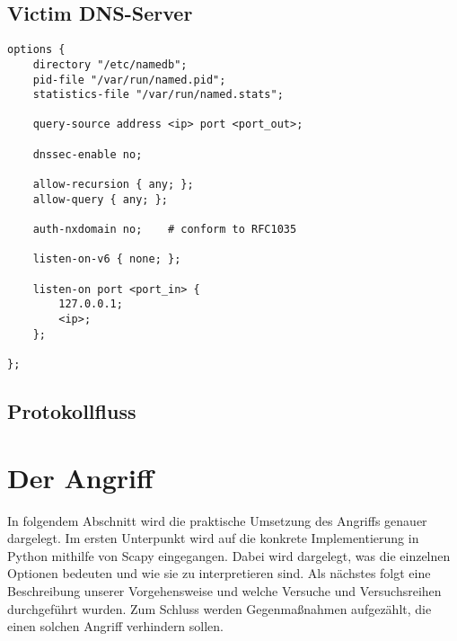\documentclass[10pt,a4paper]{article}
\begin{document}
\subsection{Victim DNS-Server}
\begin{center}
\begin{lstlisting}
options {
    directory "/etc/namedb";
    pid-file "/var/run/named.pid";
    statistics-file "/var/run/named.stats";

    query-source address <ip> port <port_out>;

    dnssec-enable no;

    allow-recursion { any; };
    allow-query { any; };

    auth-nxdomain no;    # conform to RFC1035

    listen-on-v6 { none; };

    listen-on port <port_in> {
        127.0.0.1;
        <ip>;
    };

};
\end{lstlisting}
\end{center}

\subsection{Protokollfluss}

\section{Der Angriff}
In folgendem Abschnitt wird die praktische Umsetzung des Angriffs genauer dargelegt. Im ersten Unterpunkt wird auf die konkrete Implementierung in Python mithilfe von Scapy eingegangen. Dabei wird dargelegt, was die einzelnen Optionen bedeuten und wie sie zu interpretieren sind. Als nächstes folgt eine Beschreibung unserer Vorgehensweise und welche Versuche und Versuchsreihen durchgeführt wurden. Zum Schluss werden Gegenmaßnahmen aufgezählt, die einen solchen Angriff verhindern sollen.
\end{document}
